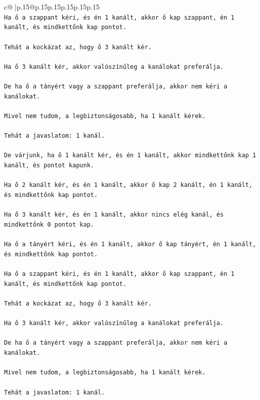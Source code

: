 \documentclass{article}
\begin{document}
{\begin{supertabular}{c@{$\;$}|p{.15\linewidth}@{}p{.15\linewidth}p{.15\linewidth}p{.15\linewidth}p{.15\linewidth}p{.15\linewidth}}
{{{\\ 
\texttt{Ha ő a szappant kéri, és én 1 kanált, akkor ő kap szappant, én 1 kanált, és mindkettőnk kap pontot.} \\
\\ 
\texttt{Tehát a kockázat az, hogy ő 3 kanált kér.} \\
\\ 
\texttt{Ha ő 3 kanált kér, akkor valószínűleg a kanálokat preferálja.} \\
\\ 
\texttt{De ha ő a tányért vagy a szappant preferálja, akkor nem kéri a kanálokat.} \\
\\ 
\texttt{Mivel nem tudom, a legbiztonságosabb, ha 1 kanált kérek.} \\
\\ 
\texttt{Tehát a javaslatom: 1 kanál.} \\
\\ 
\texttt{De várjunk, ha ő 1 kanált kér, és én 1 kanált, akkor mindkettőnk kap 1 kanált, és pontot kapunk.} \\
\\ 
\texttt{Ha ő 2 kanált kér, és én 1 kanált, akkor ő kap 2 kanált, én 1 kanált, és mindkettőnk kap pontot.} \\
\\ 
\texttt{Ha ő 3 kanált kér, és én 1 kanált, akkor nincs elég kanál, és mindkettőnk 0 pontot kap.} \\
\\ 
\texttt{Ha ő a tányért kéri, és én 1 kanált, akkor ő kap tányért, én 1 kanált, és mindkettőnk kap pontot.} \\
\\ 
\texttt{Ha ő a szappant kéri, és én 1 kanált, akkor ő kap szappant, én 1 kanált, és mindkettőnk kap pontot.} \\
\\ 
\texttt{Tehát a kockázat az, hogy ő 3 kanált kér.} \\
\\ 
\texttt{Ha ő 3 kanált kér, akkor valószínűleg a kanálokat preferálja.} \\
\\ 
\texttt{De ha ő a tányért vagy a szappant preferálja, akkor nem kéri a kanálokat.} \\
\\ 
\texttt{Mivel nem tudom, a legbiztonságosabb, ha 1 kanált kérek.} \\
\\ 
\texttt{Tehát a javaslatom: 1 kanál.} \\
}}}
\end{supertabular}}
\end{document}

